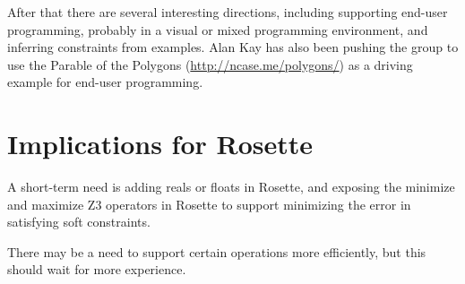 \documentclass{article}
\begin{document}
After that there are several interesting directions, including
supporting end-user programming, probably in a visual or mixed
programming environment, and inferring constraints from examples.
Alan Kay has also been pushing the group to use the Parable of the
Polygons (\url{http://ncase.me/polygons/}) as a driving example for
end-user programming.

\section{Implications for Rosette}

A short-term need is adding reals or floats in Rosette, and
exposing the minimize and maximize Z3 operators in Rosette to support
minimizing the error in satisfying soft constraints.

There may be a need to support certain operations more efficiently,
but this should wait for more experience.



\end{document}
